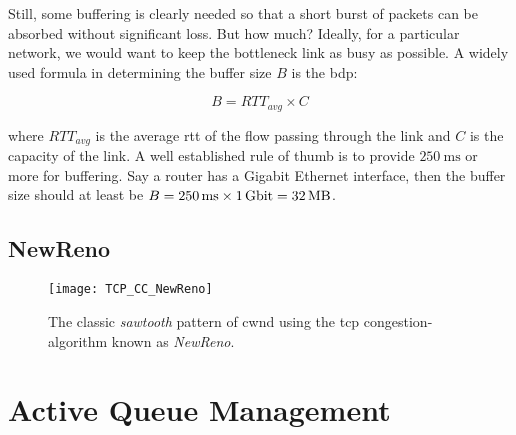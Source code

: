 Still, some buffering is clearly needed so that a short burst of packets can be absorbed without significant loss. But how much? Ideally, for a particular network, we would want to keep the bottleneck link as busy as possible. A widely used formula in determining the buffer size $B$ is the \gls{bdp}:

\begin{equation}
    B = RTT_{avg} \times C
\end{equation}

where $RTT_{avg}$ is the average \gls{rtt} of the flow passing through the link and $C$ is the capacity of the link. A well established rule of thumb is to provide $\SI{250}{\milli\second}$ or more for buffering. \cite{sizing_router_buffers} Say a router has a Gigabit Ethernet interface, then the buffer size should at least be $B = \SI{250}{\milli\second} \times \SI{1}{\giga\bit} = \SI{32}{\mega\byte}$.




\subsection{NewReno}


\begin{figure}[H]
    \centering
    \texttt{[image: TCP\_CC\_NewReno]}
    \captionsetup{width=0.6\textwidth}
    \caption{The classic \textit{sawtooth} pattern of \gls{cwnd} using the \gls{tcp} congestion-algorithm known as \textit{NewReno}. }
\end{figure}





\subsection{}
\subsection{}
\subsection{}





\section{Active Queue Management}

